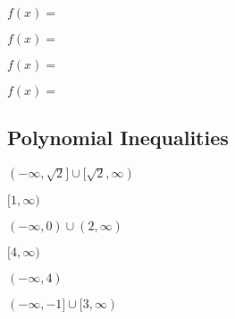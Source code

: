 \documentclass[12pt]{book}
\theoremstyle{definition}
\newcommand{\Desmos}{\href{https://www.desmos.com/}{Desmos}}
\begin{document}
\begin{oddenumerate}
	\item $f(x) = $ 
	\item $f(x) = $ 
	\item $f(x) = $ 
	\item $f(x) = $ 
\end{oddenumerate}
\subsection*{Polynomial Inequalities}
\begin{multicols}{2}
\begin{oddenumerate}
 \item $(-\infty,\sqrt{2}]\cup [\sqrt{2},\infty)$ %
 \item $[1,\infty)$ %
 \item $(-\infty,0)\cup (2,\infty)$ %
 \item $[4,\infty)$ %
 \item $(-\infty,4)$ %
 \item $(-\infty,-1]\cup [3,\infty)$ %
\end{oddenumerate}
\end{multicols}
\end{document}
